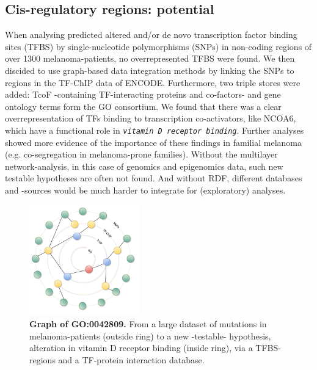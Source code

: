 \documentclass[twoside,fontsize=12pt]{article}
\begin{document}
\subsection*{Cis-regulatory regions: potential}
When analysing predicted altered and/or de novo transcription factor binding sites (TFBS) by single-nucleotide polymorphisms (SNPs) in non-coding regions of over 1300 melanoma-patients, no overrepresented TFBS were found. We then discided to use graph-based data integration methods by linking the SNPs to regions in the TF-ChIP data of ENCODE\cite{ENCODE}. Furthermore, two triple stores were added: TcoF\cite{Schaefer2011} -containing TF-interacting proteins and co-factors- and gene ontology terms form the GO consortium\cite{Ashburner2000}. We found that there was a clear overrepresentation of TFs binding to transcription co-activators, like NCOA6, which have a functional role in \emph{\lstinline|vitamin D receptor binding|}. Further analyses showed more evidence of the importance of these findings in familial melanoma (e.g. co-segregation in melanoma-prone families). Without the multilayer network-analysis, in this case of genomics and epigenomics data, such new testable hypotheses are often not found. And without RDF, different databases and -sources would be much harder to integrate for (exploratory) analyses. 
\begin{figure}[H]
    \centering
    \includegraphics[width=0.425\textwidth]{rondjeGraphs.pdf}
    \caption{\textbf{Graph of GO:0042809.} From a large dataset of mutations in melanoma-patients (outside ring) to a new -testable- hypothesis, alteration in vitamin D receptor binding (inside ring), via a TFBS-regions and a TF-protein interaction database.}
    \label{fig:mela}
\end{figure}
\end{document}
